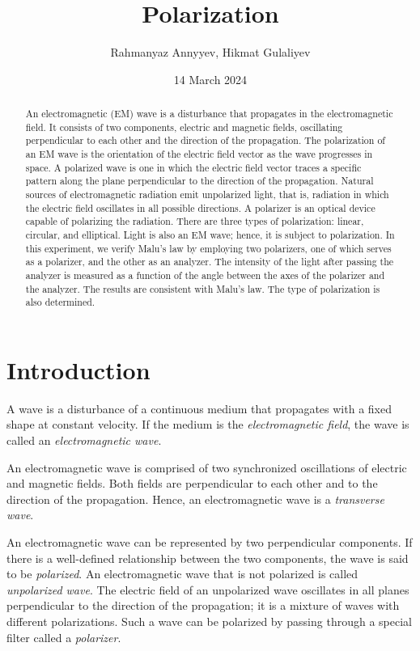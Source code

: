 \documentclass[10pt]{article}
\title{Polarization}
\author{Rahmanyaz Annyyev, Hikmat Gulaliyev}
\date{14 March 2024}
\newcommand{\td}[1]{\todo[linecolor=blue, backgroundcolor=blue!25,bordercolor=blue, size=\small]{#1}}
\begin{document}
\maketitle

\begin{abstract}

An electromagnetic (EM) wave is a disturbance that propagates in the electromagnetic field. It consists of two components, electric and magnetic fields, oscillating perpendicular to each other and the direction of the propagation. The polarization of an EM wave is the orientation of the electric field vector as the wave progresses in space. A polarized wave is one in which the electric field vector traces a specific pattern along the plane perpendicular to the direction of the propagation. Natural sources of electromagnetic radiation emit unpolarized light, that is, radiation in which the electric field oscillates in all possible directions. A polarizer is an optical device capable of polarizing the radiation. There are three types of polarization: linear, circular, and elliptical. Light is also an EM wave; hence, it is subject to polarization. In this experiment, we verify Malu's law by employing two polarizers, one of which serves as a polarizer, and the other as an analyzer. The intensity of the light after passing the analyzer is measured as a function of the angle between the axes of the polarizer and the analyzer. The results are consistent with Malu's law. The type of polarization is also determined.

\end{abstract}

\section{Introduction}

\td{Add some references.}

A wave is a disturbance of a continuous medium that propagates with a fixed shape at constant velocity. If the medium is the \textit{electromagnetic field}, the wave is called an \textit{electromagnetic wave}. 

An electromagnetic wave is comprised of two synchronized oscillations of electric and magnetic fields. Both fields are perpendicular to each other and to the direction of the propagation. Hence, an electromagnetic wave is a \textit{transverse wave}.

An electromagnetic wave can be represented by two perpendicular components. If there is a well-defined relationship between the two components, the wave is said to be \textit{polarized}. An electromagnetic wave that is not polarized is called \textit{unpolarized wave}. The electric field of an unpolarized wave oscillates in all planes perpendicular to the direction of the propagation; it is a mixture of waves with different polarizations. Such a wave can be polarized by passing through a special filter called a \textit{polarizer}.
\end{document}
